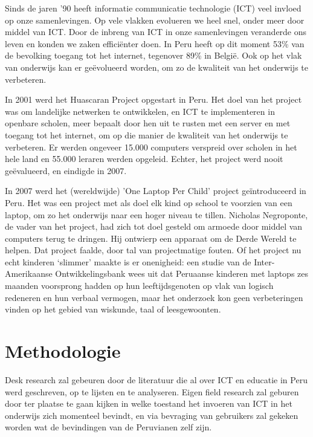 Sinds de jaren ’90 heeft informatie communicatie technologie (ICT) veel invloed op onze samenlevingen. Op vele vlakken evolueren we heel snel, onder meer door middel van ICT. Door de inbreng van ICT in onze samenlevingen veranderde ons leven en konden we zaken efficiënter doen. In Peru heeft op dit moment 53\% van de bevolking toegang tot het internet, tegenover 89\% in België. \autocite{itu2018} Ook op het vlak van onderwijs kan er geëvolueerd worden, om zo de kwaliteit van het onderwijs te verbeteren.

In 2001 werd het Huascaran Project opgestart in Peru. Het doel van het project was om landelijke netwerken te ontwikkelen, en ICT te implementeren in openbare scholen, meer bepaalt door hen uit te rusten met een server en met toegang tot het internet, om op die manier de kwaliteit van het onderwijs te verbeteren. Er werden ongeveer 15.000 computers verspreid over scholen in het hele land en 55.000 leraren werden opgeleid. Echter, het project werd nooit geëvalueerd, en eindigde in 2007. \autocite{salas-pilco2014}

In 2007 werd het (wereldwijde) ’One Laptop Per Child’ project geïntroduceerd in Peru. Het was een project met als doel elk kind op school te voorzien van een laptop, om zo het onderwijs naar een hoger niveau te tillen. Nicholas Negroponte, de vader van het project, had zich tot doel gesteld om armoede door middel van computers terug te dringen. Hij ontwierp een apparaat om de Derde Wereld te helpen. Dat project faalde, door tal van projectmatige fouten. \autocite{Wooster2018} Of het project nu echt kinderen ‘slimmer’ maakte is er onenigheid: een studie van de Inter-Amerikaanse Ontwikkelingsbank \autocite{Severin2012} wees uit dat Peruaanse kinderen met laptops zes maanden voorsprong hadden op hun leeftijdsgenoten op vlak van logisch redeneren en hun verbaal vermogen, maar het onderzoek kon geen verbeteringen vinden op het gebied van wiskunde, taal of leesgewoonten. \autocite{Murhpy2012}
 

\section{Methodologie}
\label{sec:methodologie}
Desk research zal gebeuren door de literatuur die al over ICT en educatie in Peru werd geschreven, op te lijsten en te analyseren. Eigen field research zal geburen door ter plaatse te gaan kijken in welke toestand het invoeren van ICT in het onderwijs zich momenteel bevindt, en via bevraging van gebruikers zal gekeken worden wat de bevindingen van de Peruvianen zelf zijn.
 
